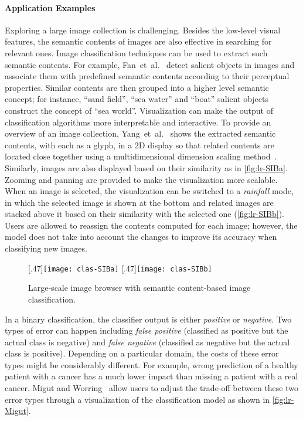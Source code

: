 \paragraph{Application Examples}
Exploring a large image collection is challenging. Besides the low-level visual features, the semantic contents of images are also effective in searching for relevant ones. Image classification techniques can be used to extract such semantic contents. For example, Fan~et~al.~\cite{Fan2004} detect salient objects in images and associate them with predefined semantic contents according to their perceptual properties. Similar contents are then grouped into a higher level semantic concept; for instance, ``sand field'', ``sea water'' and ``boat'' salient objects construct the concept of ``sea world''. Visualization can make the output of classification algorithms more interpretable and interactive. To provide an overview of an image collection, Yang~et~al.~\cite{Yang2006} shows the extracted semantic contents, with each as a glyph, in a 2D display so that related contents are located close together using a multidimensional dimension scaling method~\cite{Borg2005}. Similarly, images are also displayed based on their similarity as in \autoref{fig:lr-SIBa}. Zooming and panning are provided to make the visualization more scalable. When an image is selected, the visualization can be switched to a \emph{rainfall} mode, in which the selected image is shown at the bottom and related images are stacked above it based on their similarity with the selected one (\autoref{fig:lr-SIBb}). Users are allowed to reassign the contents computed for each image; however, the model does not take into account the changes to improve its accuracy when classifying new images.

\begin{figure}[!htb]
\centering
{}[.47\columnwidth]{\texttt{[image: clas-SIBa]}} 
\hfill
{}[.47\columnwidth]{\texttt{[image: clas-SIBb]}} 
\label{fig:lr-SIB}
\caption[Large-scale image browser using classification]{Large-scale image browser with semantic content-based image classification. }
\end{figure}

In a binary classification, the classifier output is either \emph{positive} or \emph{negative}. Two types of error can happen including \emph{false positive} (classified as positive but the actual class is negative) and \emph{false negative} (classified as negative but the actual class is positive). Depending on a particular domain, the costs of these error types might be considerably different. For example, wrong prediction of a healthy patient with a cancer has a much lower impact than missing a patient with a real cancer. Migut and Worring~\cite{Migut2010} allow users to adjust the trade-off between these two error types through a visualization of the classification model as shown in \autoref{fig:lr-Migut}.

